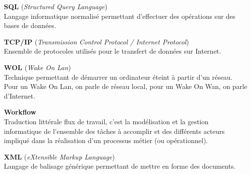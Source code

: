 \vspace{0.5cm}

\textbf{SQL} (\textit{Structured Query Language})\\
Langage informatique normalis\'e permettant d'effectuer des op\'erations sur des bases de donn\'ees.

\vspace{0.5cm}

\textbf{TCP/IP} (\textit{Transmission Control Protocol / Internet Protocol})\\
Ensemble de protocoles utilis\'es pour le transfert de donn\'ees sur Internet.

\vspace{0.5cm}

\textbf{WOL} (\textit{Wake On Lan})\\
Technique permettant de d\'emarrer un ordinateur \'eteint \`a partir d'un r\'eseau. 
Pour un Wake On Lan, on parle de r\'eseau local, pour un Wake On Wan, on parle d'Internet.

\vspace{0.5cm}

\textbf{Workflow}\\
Traduction litt\'erale \og{}flux de travail\fg{}, c'est la mod\'elisation et la gestion informatique de l'ensemble des t\^aches \`a accomplir et des diff\'erents acteurs impliqu\'e dans la r\'ealisation d'un processus m\'etier (ou op\'erationnel).

\vspace{0.5cm}

\textbf{XML} (\textit{eXtensible Markup Language})\\
Langage de balisage g\'en\'erique permettant de mettre en forme des documents.



\clearpage
